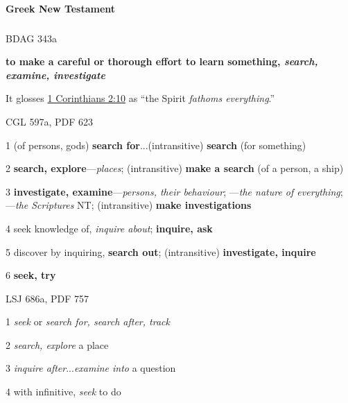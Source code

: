 		\paragraph{Greek New Testament} %
			\label{SEARCH-GREEK}
		
			\subparagraph{\texorpdfstring{}{}}
				\label{ERAUNAO}
			
				\begin{compactdesc}
					\item[BDAG 343a] \textbf{}
						\begin{compactitem}
							\item \textbf{to make a careful or thorough effort to learn something, \textit{search, examine, investigate}}
								\begin{compactitem}
									\item It glosses \hyperref[1CORINTHIANS-2-10]{1 Corinthians 2:10} as ``the Spirit \textit{fathoms everything}.''
								\end{compactitem}
						\end{compactitem}
					\item[CGL 597a, PDF 623] \textbf{}
						\begin{compactitem}
							\item[1] (of persons, gods) \textbf{search for}...(intransitive) \textbf{search} (for something)
							\item[2] \textbf{search, explore}---\textit{places}; (intransitive) \textbf{make a search} (of a person, a ship)
							\item[3] \textbf{investigate, examine}---\textit{persons, their behaviour}; ---\textit{the nature of everything}; ---\textit{the Scriptures} NT; (intransitive) \textbf{make investigations}
							\item[4] seek knowledge of, \textit{inquire about}; \textbf{inquire, ask}
							\item[5] discover by inquiring, \textbf{search out}; (intransitive) \textbf{investigate, inquire}
							\item[6] \textbf{seek, try}
						\end{compactitem}
					\item[LSJ 686a, PDF 757] \textbf{}
						\begin{compactitem}
							\item[1] \textit{seek} or \textit{search for, search after, track}
							\item[2] \textit{search, explore} a place
							\item[3] \textit{inquire after}...\textit{examine into} a question
							\item[4] with infinitive, \textit{seek} to do
						\end{compactitem}
				\end{compactdesc}
				

